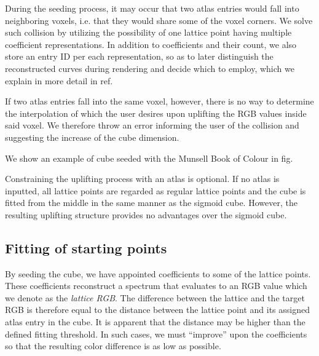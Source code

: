 During the seeding process, it may occur that two atlas entries would fall into neighboring voxels, i.e. that they would share some of the voxel corners. We solve such collision by utilizing the possibility of one lattice point having multiple coefficient representations. In addition to coefficients and their count, we also store an entry ID per each representation, so as to later distinguish the reconstructed curves during rendering and decide which to employ, which we explain in more detail in ref.

If two atlas entries fall into the same voxel, however, there is no way to determine the interpolation of which the user desires upon uplifting the RGB values inside said voxel. We therefore throw an error informing the user of the collision and suggesting the increase of the cube dimension.

We show an example of cube seeded with the Munsell Book of Colour in fig. 

Constraining the uplifting process with an atlas is optional. If no atlas is inputted, all lattice points are regarded as regular lattice points and the cube is fitted from the middle in the same manner as the sigmoid cube. However, the resulting uplifting structure provides no advantages over the sigmoid cube.

\subsection{Fitting of starting points}

By seeding the cube, we have appointed coefficients to some of the lattice points. These coefficients reconstruct a spectrum that evaluates to an RGB value which we denote as the \emph{lattice RGB}. The difference between the lattice and the target RGB is therefore equal to the distance between the lattice point and its assigned atlas entry in the cube. It is apparent that the distance may be higher than the defined fitting threshold. In such cases, we must ``improve'' upon the coefficients so that the resulting color difference is as low as possible.

